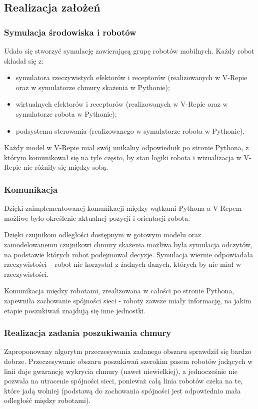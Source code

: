 \documentclass[a4paper, 12pt]{article}
\begin{document}
	\subsection{Realizacja założeń}
	
	\subsubsection{Symulacja środowiska i robotów}
	Udało się stworzyć symulację zawierającą grupę robotów mobilnych. Każdy robot składał się z:
	\begin{itemize}
		\item symulatora rzeczywistych efektorów i receptorów (realizowanych w V-Repie oraz w symulatorze chmury skażenia w Pythonie);
		\item wirtualnych efektorów i receptorów (realizowanych w V-Repie oraz w symulatorze robota w Pythonie);
		\item podsystemu sterowania (realizowanego w symulatorze robota w Pythonie).
	\end{itemize}
	Każdy model w V-Repie miał swój unikalny odpowiednik po stronie Pythona, z którym komunikował się na tyle często, by stan logiki robota i wizualizacja w V-Repie nie różniły się między sobą.	
	
	\subsubsection{Komunikacja}	
	
	Dzięki zaimplementowanej komunikacji między wątkami Pythona a V-Repem możliwe było określenie aktualnej pozycji i orientacji robota.
	
	Dzięki czujnikom odległości dostępnym w gotowym modelu oraz zamodelowanemu czujnikowi chmury skażenia możliwa była symulacja odczytów, na podstawie których robot podejmował decyzje. Symulacja wiernie odpowiadała rzeczywistości -- robot nie korzystał z żadnych danych, których by nie miał w rzeczywistości.
	
	Komunikacja między robotami, zrealizowana w całości po stronie Pythona, zapewniła zachowanie spójności sieci - roboty zawsze miały informację, na jakim etapie poszukiwań znajdują się inne jednostki.
	
	\subsubsection{Realizacja zadania poszukiwania chmury}
	Zaproponowany algorytm przeczesywania zadanego obszaru sprawdził się bardzo dobrze. Przeczesywanie obszaru poszukiwań szerokim pasem robotów jadących w linii daje gwarancję wykrycia chmury (nawet niewielkiej), a jednocześnie nie pozwala na utracenie spójności sieci, ponieważ całą linia robotów czeka na te, które jadą wolniej (podstawą do zachowania spójności jest odpowiednio mała odległość między robotami).	
	
\end{document}

